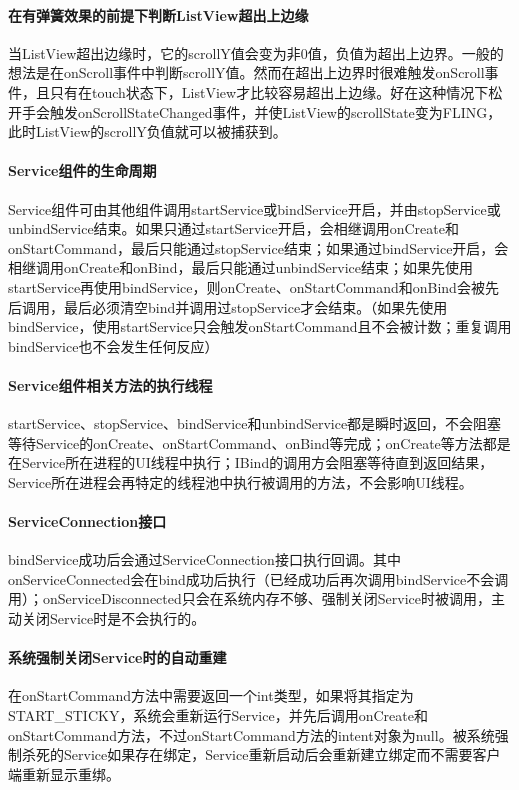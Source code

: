 \documentclass[UTF8]{ctexart}
\begin{document}
    \paragraph{在有弹簧效果的前提下判断ListView超出上边缘}
    当ListView超出边缘时，它的scrollY值会变为非0值，负值为超出上边界。一般的想法是在onScroll事件中判断scrollY值。然而在超出上边界时很难触发onScroll事件，且只有在touch状态下，ListView才比较容易超出上边缘。好在这种情况下松开手会触发onScrollStateChanged事件，并使ListView的scrollState变为FLING，此时ListView的scrollY负值就可以被捕获到。
    \paragraph{Service组件的生命周期}
    Service组件可由其他组件调用startService或bindService开启，并由stopService或unbindService结束。如果只通过startService开启，会相继调用onCreate和onStartCommand，最后只能通过stopService结束；如果通过bindService开启，会相继调用onCreate和onBind，最后只能通过unbindService结束；如果先使用startService再使用bindService，则onCreate、onStartCommand和onBind会被先后调用，最后必须清空bind并调用过stopService才会结束。（如果先使用bindService，使用startService只会触发onStartCommand且不会被计数；重复调用bindService也不会发生任何反应）
    \paragraph{Service组件相关方法的执行线程}
    startService、stopService、bindService和unbindService都是瞬时返回，不会阻塞等待Service的onCreate、onStartCommand、onBind等完成；onCreate等方法都是在Service所在进程的UI线程中执行；IBind的调用方会阻塞等待直到返回结果，Service所在进程会再特定的线程池中执行被调用的方法，不会影响UI线程。
    \paragraph{ServiceConnection接口}
    bindService成功后会通过ServiceConnection接口执行回调。其中onServiceConnected会在bind成功后执行（已经成功后再次调用bindService不会调用）；onServiceDisconnected只会在系统内存不够、强制关闭Service时被调用，主动关闭Service时是不会执行的。
    \paragraph{系统强制关闭Service时的自动重建}
    在onStartCommand方法中需要返回一个int类型，如果将其指定为START_STICKY，系统会重新运行Service，并先后调用onCreate和onStartCommand方法，不过onStartCommand方法的intent对象为null。被系统强制杀死的Service如果存在绑定，Service重新启动后会重新建立绑定而不需要客户端重新显示重绑。
\end{document}
